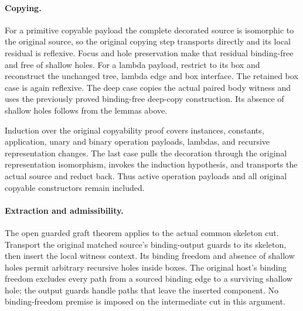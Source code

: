 


\paragraph{Copying.}
For a primitive copyable payload the complete decorated source is
isomorphic to the original source, so the original copying step transports
directly and its local residual is reflexive. Focus and hole preservation
make that residual binding-free and free of shallow holes. For a lambda
payload, restrict to its box and reconstruct the unchanged tree, lambda
edge and box interface. The retained box case is again reflexive. The deep
case copies the actual paired body witness and uses the previously proved
binding-free deep-copy construction. Its absence of shallow holes follows
from the lemmas above.

Induction over the original copyability proof covers instances, constants,
application, unary and binary operation payloads, lambdas, and recursive
representation changes. The last case pulls the decoration through the
original representation isomorphism, invokes the induction hypothesis,
and transports the actual source and reduct back. Thus active operation
payloads and all original copyable constructors remain included.





\par{}

\paragraph{Extraction and admissibility.}
The open guarded graft theorem applies to the actual common skeleton cut.
Transport the original matched source's binding-output guards to its
skeleton, then insert the local witness context. Its binding freedom and
absence of shallow holes permit arbitrary recursive holes inside boxes.
The original host's binding freedom excludes every path from a sourced
binding edge to a surviving shallow hole; the output guards handle paths
that leave the inserted component. No binding-freedom premise is imposed
on the intermediate cut in this argument.

